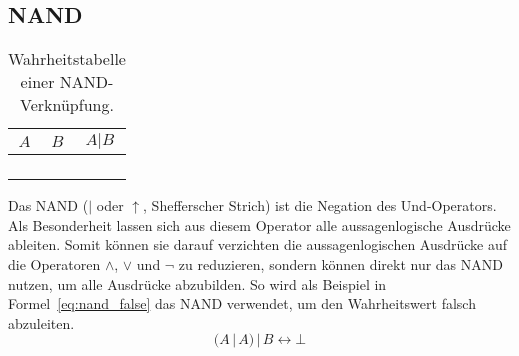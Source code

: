 \subsection{NAND}
%
\begin{table}[ht]
 \begin{center}
  \begin{tabular}{cc|c}
   \hline
    $A$ & $B$ & $A | B$ \\
   \hline \hline
    \F  & \F  & \T \\
    \F  & \T  & \T \\
    \T  & \F  & \T \\
    \T  & \T  & \F \\
  \end{tabular}
  \caption{Wahrheitstabelle einer NAND-Verknüpfung.}
  \label{fig:nand_operator}
 \end{center}
\end{table}
%
Das NAND ($|$ oder $\uparrow$, Shefferscher Strich) ist die Negation des Und-Operators. Als Besonderheit lassen sich aus diesem Operator alle aussagenlogische Ausdrücke ableiten. Somit können sie darauf verzichten die aussagenlogischen Ausdrücke auf die Operatoren $\land$, $\lor$ und $\neg$ zu reduzieren, sondern können direkt nur das NAND nutzen, um alle Ausdrücke abzubilden. So wird als Beispiel in Formel~\ref{eq:nand_false} das NAND verwendet, um den Wahrheitswert falsch abzuleiten.
\begin{equation}
 \label{eq:nand_false}
  (A \,|\, A) \,|\, B \leftrightarrow \bot
\end{equation}
%
